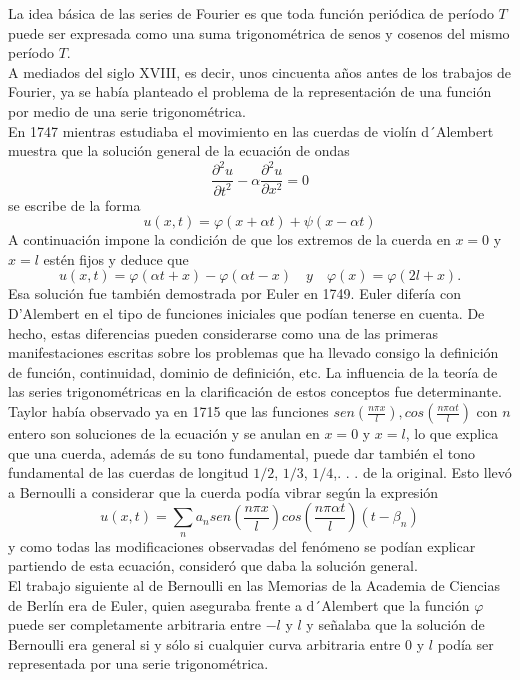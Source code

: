 \documentclass[a4paper,12pt]{article}
\begin{document}
La idea básica de las series de Fourier es que toda función periódica de período $T$ puede ser expresada como una suma trigonométrica de senos y cosenos del mismo período $T$.\\
\indent A mediados del siglo XVIII, es decir, unos cincuenta años antes de los trabajos de Fourier, ya se había planteado el problema de la representación de una función por medio de una serie trigonométrica.\\
\indent En 1747 mientras estudiaba el movimiento en las cuerdas de violín d´Alembert muestra que la solución general de la ecuación de ondas
\[ \frac{\partial ^2u}{\partial t^2}-\alpha\frac{\partial^2u}{\partial x^2} = 0 \]
se escribe de la forma
\[ u(x,t) = \varphi(x + \alpha t) + \psi(x - \alpha t)  \]
A continuación impone la condición de que los extremos de la cuerda en $x = 0$ y $x = l$ estén fijos y deduce que
\[ u(x, t) = \varphi(\alpha t + x) - \varphi(\alpha t - x) \quad y \quad \varphi(x) = \varphi(2l + x). \]
Esa solución fue también demostrada por Euler en 1749. Euler difería con D’Alembert en el tipo de funciones iniciales que podían tenerse en cuenta. De hecho, estas diferencias pueden considerarse como una de las primeras
manifestaciones escritas sobre los problemas que ha llevado consigo la definición de función, continuidad, dominio de definición, etc. La influencia de la teoría de las series trigonométricas en la clarificación de estos conceptos fue determinante.\\
\indent Taylor había observado ya en 1715 que las funciones $sen\left( \frac{n\pi x}{l}\right), cos\left(\frac{n\pi \alpha t}{l}\right)$ con $n$ entero son soluciones de la ecuación y se anulan en $x = 0$ y $x = l$, lo que explica que una cuerda, además de su tono fundamental, puede dar también el tono fundamental de las cuerdas de longitud $1/2$, $1/3$, $1/4$,. . . de la original. Esto llevó a Bernoulli a considerar que la cuerda podía vibrar según la expresión
\[ u(x,t) = \sum _n a_n sen\left( \frac{n\pi x}{l}\right)cos\left(\frac{n\pi \alpha t}{l}\right)(t-\beta_n)\]
y como todas las modificaciones observadas del fenómeno se podían explicar partiendo de esta ecuación, consideró que daba la solución general.\\
\indent El trabajo siguiente al de Bernoulli en las Memorias de la Academia de Ciencias de Berlín era de Euler, quien aseguraba frente a d´Alembert que la función $\varphi$ puede ser completamente arbitraria entre $-l$ y $l$ y señalaba que la solución de Bernoulli era general si y sólo si cualquier curva arbitraria entre $0$ y $l$ podía ser representada por una serie trigonométrica.\\
\end{document}
